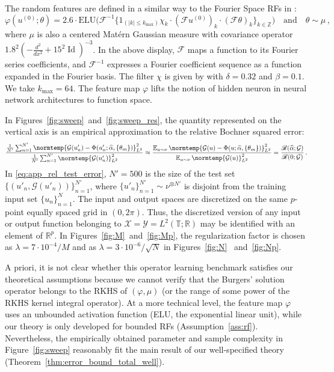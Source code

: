 \documentclass{article}
\theoremstyle{plain}
\theoremstyle{my_def}
\theoremstyle{my_rem}
\numberwithin{equation}{section}
\numberwithin{theorem}{section}%
\newcommand{\R}{\mathbb{R}}
\newcommand{\E}{\mathbb{E}}
\newcommand{\scrR}{\mathscr{R}}
\newcommand{\cG}{\mathcal{G}}
\newcommand{\norm}{\normtemp}
\renewcommand{\hat}{\widehat}
\DeclareMathOperator{\Id}{Id} %
\renewcommand{\E}{\operatorname{\mathbb{E}}} %
\newcommand{\al}{\alpha}
\def\qa{\quad\text{and}\quad}
\newcommand{\Th}{{\{\theta_m\}}}
\newcommand{\alhat}{\hat{\al}}
\begin{document}
The random features are defined in a similar way to the Fourier Space RFs in \cite[Sect. 3.1, p. 15]{rfm}:
\begin{equation*}
    \varphi(u^{(0)};\theta)=2.6\cdot\mathrm{ELU}\bigl(\mathcal{F}^{-1}\{1_{(|k|\leq k_{\mathrm{max}})}\chi_k \cdot(\mathcal{F}u^{(0)})_k\cdot (\mathcal{F}\theta)_k \}_{k\in\mathbb{Z}}\bigr)\qa \theta\sim\mu\,,
\end{equation*}
where $\mu$ is also a centered Mat\'ern Gaussian measure with covariance operator $1.8^2(-\frac{d^2}{dx^2} + 15^2\Id)^{-3}$. In the above display, $\mathcal{F}$ maps a function to its Fourier series coefficients, and $\mathcal{F}^{-1}$ expresses a Fourier coefficient sequence as a function expanded in the Fourier basis. The filter $\chi$ is given by \cite[Eqn. 3.6, p. 15]{rfm} with $\delta=0.32$ and $\beta=0.1$. We take $k_{\mathrm{max}}=64$. The feature map $\varphi$ lifts the notion of hidden neuron in neural network architectures to function space.

 In Figures~\ref{fig:sweep}~and~\ref{fig:sweep_res}, the quantity represented on the vertical axis is an empirical approximation to the relative Bochner squared error:
 \begin{equation}\label{eq:app_rel_test_error}
     \frac{\frac{1}{N'}\sum_{n=1}^{N'}\norm{\cG(u'_n)-\Phi(u'_n;\alhat,\Th)}_{L^2}^2}{\frac{1}{N'}\sum_{n=1}^{N'}\norm{\cG(u'_n)}_{L^2}^2} \approx \frac{\E_{u\sim\nu}\norm{\cG(u)-\Phi(u;\alhat,\Th)}_{L^2}^2}{\E_{u\sim\nu}\norm{\cG(u)}_{L^2}^2}=\frac{\scrR(\alhat;\cG)}{\scrR(0;\cG)}\,.
 \end{equation}
 In \eqref{eq:app_rel_test_error}, $N'=500$ is the size of the test set $\{(u'_n,\cG(u'_n))\}_{n=1}^{N'}$, where $\{u'_n\}_{n=1}^{N'}\sim\nu^{\otimes N'}$ is disjoint from the training input set $\{u_n\}_{n=1}^N$. The input and output spaces are discretized on the same $p$-point equally spaced grid in $(0,2\pi)$. Thus, the discretized version of any input or output function belonging to $\mathcal{X} = \mathcal{Y}=L^2(\mathbb{T};\mathbb{R}) $ may be identified with an element of $\R^p$. In Figures~\ref{fig:M}~and~\ref{fig:Mp}, the regularization factor is chosen as $\lambda=7\cdot 10^{-4}/M$ and as $\lambda=3\cdot 10^{-6}/\sqrt{N}$ in Figures~\ref{fig:N} ~and~\ref{fig:Np}.

 A priori, it is not clear whether this operator learning benchmark satisfies our theoretical assumptions because we cannot verify that the Burgers' solution operator 
 belongs to the RKHS of $(\varphi,\mu)$ (or the range of some power of the RKHS kernel integral operator). At a more technical level, the feature map $\varphi$ uses an unbounded activation function (ELU, the exponential linear unit), while our theory is only developed for bounded RFs (Assumption~\ref{ass:rf}). Nevertheless, the empirically obtained parameter and sample complexity in Figure~\ref{fig:sweep} reasonably fit the main result of our well-specified theory (Theorem~\ref{thm:error_bound_total_well}).
\end{document}
